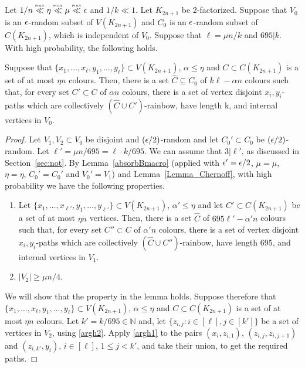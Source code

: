 \begin{corollary}\label{cor-absorbBmacro} Let $1/n\ll \eta \ll \mu\ll \eps$ and $1/k\ll 1$. Let $K_{2n+1}$ be 2-factorized. Suppose that $V_0$ is an $\epsilon$-random subset of $V(K_{2n+1})$ and $C_0$ is an $\epsilon$-random subset of $C(K_{2n+1})$, which is independent of $V_0$. Suppose that $\ell=\mu n/k$ and  $695|k$. With high probability, the following holds.%

Suppose that $\{x_1,\ldots,x_{\ell},y_1,\ldots,y_\ell\}\subset V(K_{2n+1})$, $\alpha\leq \eta$ and $C\subset C(K_{2n+1})$ is a set of at most $\eta n$ colours. Then, there is a set $\hat{C}\subseteq C_0$ of $k\ell-\alpha n$ colours such that, for every set $C'\subset C$ of $\alpha n$ colours, there is a set of vertex disjoint $x_i,y_i$-paths which are collectively $(\hat{C}\cup C')$-rainbow, have length k, and internal vertices in $V_0$.
\end{corollary}
\begin{proof} Let $V_1,V_2\subset V_0$ be disjoint and $(\epsilon/2)$-random and let $C_0'\subset C_0$ be $(\epsilon/2)$-random. Let $\ell'=\mu n/695=\ell \cdot k/695$. We can assume that $3|\ell'$, as discussed in Section~\ref{sec:not}.
By Lemma~\ref{absorbBmacro} (applied with $\epsilon'=\epsilon/2$, $\mu=\mu$, $\eta=\eta$, $C_0'=C_0'$ and $V_0'=V_1$) and Lemma~\ref{Lemma_Chernoff}, with high probability we have the following properties.

\begin{enumerate}[label = {\bfseries \Alph{propcounter}\arabic{enumi}}]
\item
Let $\{x_1,\ldots,x_{\ell'},y_1,\ldots,y_{\ell'}\}\subset V(K_{2n+1})$, $\alpha'\leq \eta$ and let $C'\subset C(K_{2n+1})$ be a set of at most $\eta n$ vertices. Then, there is a set $\hat{C}$ of $695\ell'-\alpha' n$ colours such that, for every set $C''\subset C$ of $\alpha' n$ colours, there is a set of vertex disjoint $x_i,y_i$-paths which are collectively $(\hat{C}\cup C'')$-rainbow, have length 695, and internal vertices in $V_1$.\label{argh1}
\item $|V_2|\geq \mu n/4$.\label{argh2}
\end{enumerate}
We will show that the property in the lemma holds. Suppose therefore that $\{x_1,\ldots,x_{\ell},y_1,\ldots,y_\ell\}\subset V(K_{2n+1})$, $\alpha\leq \eta$ and $C\subset C(K_{2n+1})$ is a set of at most $\eta n$ colours. Let $k'=k/695\in \mathbb{N}$ and, let $\{z_{i,j}:i\in [\ell],j\in [k']\}$ be a set of vertices in $V_2$, using \ref{argh2}. Apply \ref{argh1} to the pairs $(x_i,z_{i,1})$, $(z_{i,j},z_{i,j+1})$ and $(z_{i,k'},y_i)$, $i\in [\ell]$, $1\leq j<k'$, and take their union, to get the required paths.
\end{proof}

